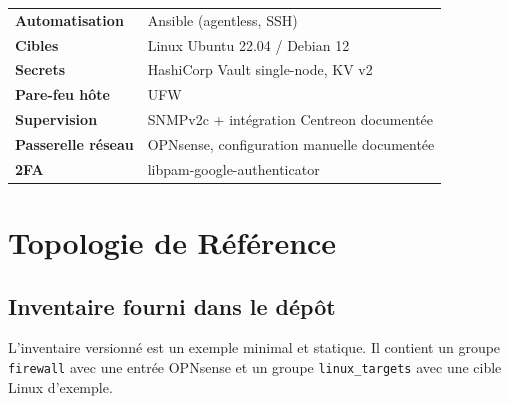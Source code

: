 \documentclass[11pt,a4paper]{article}
\begin{document}
\begin{tcolorbox}[
  enhanced,
  colback=LightGray,
  colframe=BorderGray,
  boxrule=0.8pt,
  arc=6pt,
  left=10pt,right=10pt,top=8pt,bottom=8pt
]
\renewcommand{\arraystretch}{1.4}
\begin{tabular}{@{} L{4.2cm} L{9cm} @{}}
  \textcolor{PrimaryBlue}{\textbf{Automatisation}} & Ansible (agentless, SSH) \\
  \textcolor{PrimaryBlue}{\textbf{Cibles}} & Linux Ubuntu 22.04 / Debian 12 \\
  \textcolor{PrimaryBlue}{\textbf{Secrets}} & HashiCorp Vault single-node, KV v2 \\
  \textcolor{PrimaryBlue}{\textbf{Pare-feu hôte}} & UFW \\
  \textcolor{PrimaryBlue}{\textbf{Supervision}} & SNMPv2c + intégration Centreon documentée \\
  \textcolor{PrimaryBlue}{\textbf{Passerelle réseau}} & OPNsense, configuration manuelle documentée \\
  \textcolor{PrimaryBlue}{\textbf{2FA}} & libpam-google-authenticator \\
\end{tabular}
\end{tcolorbox}

\section{Topologie de Référence}

\subsection{Inventaire fourni dans le dépôt}

L'inventaire versionné est un exemple minimal et statique. Il contient un groupe \texttt{firewall} avec une entrée OPNsense et un groupe \texttt{linux\_targets} avec une cible Linux d'exemple.
\end{document}
